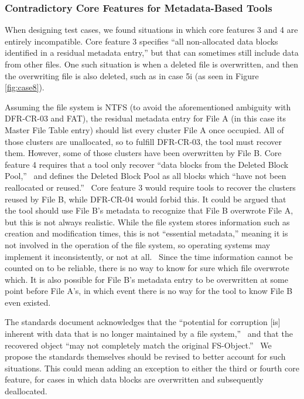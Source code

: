 \subsubsection{Contradictory Core Features for Metadata-Based Tools}
\begin{paraphrase}
When designing test cases, we found situations in which core features 3 and 4 are entirely incompatible. 
Core feature 3 specifies ``all non-allocated data blocks identified in a residual metadata entry,''\cite{meta:dfr:standards} but that can sometimes still include data from other files. 
One such situation is when a deleted file is overwritten, and then the overwriting file is also deleted, such as in case 5i (as seen in Figure \ref{fig:case8}).

Assuming the file system is NTFS (to avoid the aforementioned ambiguity with DFR-CR-03 and FAT), the residual metadata entry for File A (in this case its Master File Table entry) should list every cluster File A once occupied. 
All of those clusters are unallocated, so to fulfill DFR-CR-03, the tool must recover them. 
However, some of those clusters have been overwritten by File B. Core feature 4 requires that a tool only recover ``data blocks from the Deleted Block Pool,''~\cite{meta:dfr:standards} and defines the Deleted Block Pool as all blocks which ``have not been reallocated or reused.''~\cite{meta:dfr:standards}
Core feature 3 would require tools to recover the clusters reused by File B, while DFR-CR-04 would forbid this. 
It could be argued that the tool should use File B's metadata to recognize that File B overwrote File A, but this is not always realistic. 
While the file system stores information such as creation and modification times, this is not ``essential metadata,'' meaning it is not involved in the operation of the file system, so operating systems may implement it inconsistently, or not at all.~\cite{carrier:filesystems}
Since the time information cannot be counted on to be reliable, there is no way to know for sure which file overwrote which. 
It is also possible for File B's metadata entry to be overwritten at some point before File A's, in which event there is no way for the tool to know File B even existed.

The standards document acknowledges that the ``potential for corruption [is] inherent with data that is no longer maintained by a file system,''~\cite{meta:dfr:standards} and that the recovered object ``may not completely match the original FS-Object.''~\cite{meta:dfr:standards}
We propose the standards themselves should be revised to better account for such situations.
This could mean adding an exception to either the third or fourth core feature, for cases in which data blocks are overwritten and subsequently deallocated.


\end{paraphrase}
